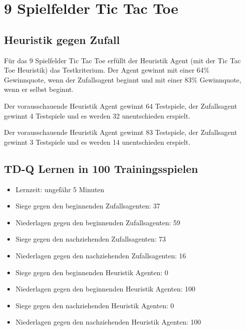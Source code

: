 \section{9 Spielfelder Tic Tac Toe}

\subsection{Heuristik gegen Zufall}
Für das 9 Spielfelder Tic Tac Toe erfüllt der Heuristik Agent (mit der Tic Tac Toe Heuristik) das Testkriterium. Der Agent gewinnt mit einer 64\% Gewinnquote, wenn der Zufallsagent beginnt und mit einer 83\% Gewinnquote, wenn er selbst beginnt.

Der vorausschauende Heuristik Agent gewinnt 64 Testspiele, der Zufallsagent gewinnt 4 Testspiele und es werden 32 unentschieden erspielt.

Der vorausschauende Heuristik Agent gewinnt 83 Testspiele, der Zufallsagent gewinnt 3 Testspiele und es werden 14 unentschieden erspielt. 

\subsection{TD-Q Lernen in 100 Trainingsspielen}
\begin{itemize}
\item Lernzeit: ungefähr 5 Minuten

\item Siege gegen den beginnenden Zufallsagenten: 37
\item Niederlagen gegen den beginnenden Zufallsagenten: 59

\item Siege gegen den nachziehenden Zufallsagenten: 73
\item Niederlagen gegen den nachziehenden Zufallsagenten: 16

\item Siege gegen den beginnenden Heuristik Agenten: 0
\item Niederlagen gegen den beginnenden Heuristik Agenten: 100

\item Siege gegen den nachziehenden Heuristik Agenten: 0
\item Niederlagen gegen den nachziehenden Heuristik Agenten: 100
\end{itemize}

